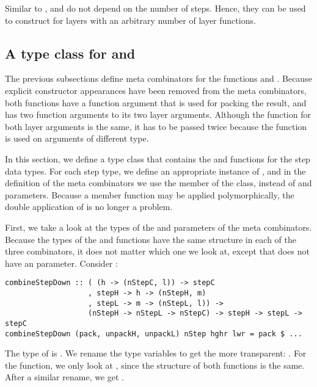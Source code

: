 \documentclass[preprint,natbib]{sigplanconf}
\begin{document}
Similar to ,  and  do not depend on the number of steps. Hence, they can be used to construct  for layers with an arbitrary number of layer functions.

%																
\subsection{A type class for  and } \label{sect:typeClass}


\bc The previous subsections define meta combinators for the functions  and . Because explicit constructor appearances have been removed from the meta combinators, both functions have a function argument that is used for packing the result, and  has two function arguments to  its two layer arguments. Although the  function for both layer arguments is the same, it has to be passed twice because the function is used on arguments of different type. \ec

In this section, we define a type class  that contains the  and  functions for the step data types. For each step type, we define an appropriate instance of , and in the definition of the meta combinators we use the member of the class, instead of  and  parameters. Because a member function may be applied polymorphically, the double application of  is no longer a problem.

First, we take a look at the types of the  and  parameters of the meta combinators. Because the types of the  and  functions have the same structure in each of the three combinators, it does not matter which one we look at, except that  does not have an  parameter. Consider :

\begin{small}
\begin{verbatim}
combineStepDown :: ( (h -> (nStepC, l)) -> stepC 
                   , stepH -> h -> (nStepH, m)
                   , stepL -> m -> (nStepL, l)) -> 
                   (nStepH -> nStepL -> nStepC) -> stepH -> stepL -> stepC
combineStepDown (pack, unpackH, unpackL) nStep hghr lwr = pack $ ...
\end{verbatim}
\end{small}

The type of  is . We rename the type variables  to get the more transparent: . For the  function, we only look at , since the structure of both  functions is the same. After a similar rename, we get .
\end{document}
